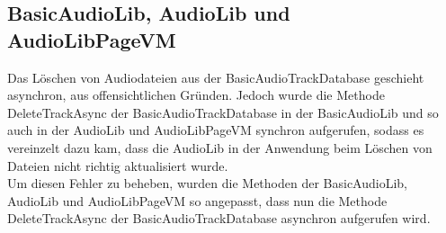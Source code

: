 \documentclass[../implementierung.tex]{subfiles}
\begin{document}
\subsection{BasicAudioLib, AudioLib und AudioLibPageVM}
Das Löschen von Audiodateien aus der BasicAudioTrackDatabase geschieht asynchron, aus offensichtlichen Gründen. Jedoch wurde die Methode DeleteTrackAsync der BasicAudioTrackDatabase in der BasicAudioLib und so auch in der AudioLib und AudioLibPageVM synchron aufgerufen, sodass es vereinzelt dazu kam, dass die AudioLib in der Anwendung beim Löschen von Dateien nicht richtig aktualisiert wurde.\\ Um diesen Fehler zu beheben, wurden die Methoden der BasicAudioLib, AudioLib und AudioLibPageVM so angepasst, dass nun die Methode DeleteTrackAsync der BasicAudioTrackDatabase asynchron aufgerufen wird.
\end{document}
